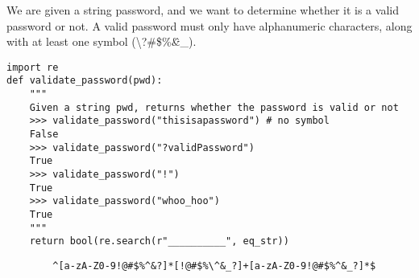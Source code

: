 \begin{blocksection}
\question We are given a string password, and we want to determine whether it is a valid password or not. 
A valid password must only have alphanumeric characters, along with at least one symbol 
(\textbackslash?\#\$\%\^\&\*\!\_).

\begin{lstlisting}
import re
def validate_password(pwd):
    """
    Given a string pwd, returns whether the password is valid or not
    >>> validate_password("thisisapassword") # no symbol
    False
    >>> validate_password("?validPassword")
    True
    >>> validate_password("!")
    True
    >>> validate_password("whoo_hoo")
    True
    """
    return bool(re.search(r"__________", eq_str))
\end{lstlisting}

\begin{solution}[2in]
    \begin{lstlisting}
        ^[a-zA-Z0-9!@#$%^&?]*[!@#$%\^&_?]+[a-zA-Z0-9!@#$%^&_?]*$
    \end{lstlisting}
\end{solution}
\end{blocksection}
